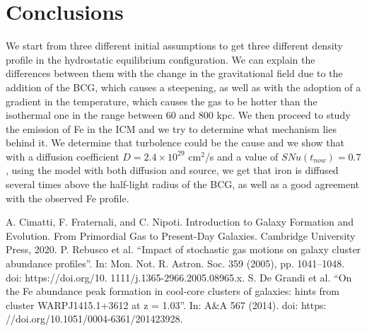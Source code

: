 \documentclass{article}
\begin{document}
\section*{Conclusions}
We start from three different initial assumptions to get three different density profile in the hydrostatic equilibrium configuration. We can explain the differences between them with the change in the gravitational field due to the addition of the BCG, which causes a steepening, as well as with the adoption of a gradient in the temperature, which causes the gas to be hotter than the isothermal one in the range between $60$ and $800$ kpc. We then proceed to study the emission of Fe in the ICM and we try to determine what mechanism lies behind it. We determine that turbolence could be the cause and we show that with a diffusion coefficient $D=2.4\times 10^{29}$ cm$^{2}$/s and a value
of $SNu(t_{now})=0.7$, using the model with both diffusion and source, we get that iron is diffused several times above the half-light radius of the BCG, as well as a good agreement with the observed Fe profile.


\begin{thebibliography}{3}
	A. Cimatti, F. Fraternali, and C. Nipoti. Introduction to Galaxy Formation and Evolution.
From Primordial Gas to Present-Day Galaxies. Cambridge University Press, 2020.
	P. Rebusco et al. “Impact of stochastic gas motions on galaxy cluster abundance profiles”.
In: Mon. Not. R. Astron. Soc. 359 (2005), pp. 1041–1048. doi: https://doi.org/10.
1111/j.1365-2966.2005.08965.x.
S. De Grandi et al. “On the Fe abundance peak formation in cool-core clusters of galaxies:
hints from cluster WARPJ1415.1+3612 at z = 1.03”. In: A\&A 567 (2014). doi: https:
//doi.org/10.1051/0004-6361/201423928.
\end{thebibliography}
\end{document}
